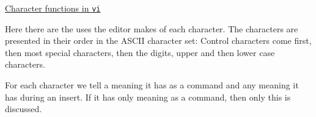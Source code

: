 \topmargin 0cm
\headsep 0cm
\footheight 0.5cm
\footskip 1cm
\evensidemargin 0cm
\oddsidemargin 0.5cm
\textwidth 16cm
\textheight 23.5cm
\itemsep 0cm
\def\^#1{{\tt \symbol{"5E}#1}}


\let\ul = \underline

\begin{center}
\LARGE\ul{Character functions in {\tt vi}}
\end{center}

\vspace{2.cm}

Here there are the uses the editor makes of each character. The characters are
presented in their order in the ASCII character set: Control characters come
first, then most special characters, then the digits, upper and then lower
case characters.

For each character we tell a meaning it has as a command and any meaning it
has during an insert. If it has only meaning as a command, then only this is
discussed.

